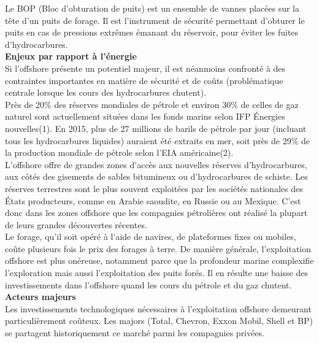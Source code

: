 \documentclass[8pt]{article}
\begin{document}
Le BOP (Bloc d’obturation de puits) est un ensemble de vannes placées sur la tête d’un puits de forage. Il est l’instrument de sécurité permettant d’obturer le puits en cas de pressions extrêmes émanant du réservoir, pour éviter les fuites d’hydrocarbures.\\

\textbf{Enjeux par rapport à l'énergie}\\

Si l’offshore présente un potentiel majeur, il est néanmoins confronté à des contraintes importantes en matière de sécurité et de coûts (problématique centrale lorsque les cours des hydrocarbures chutent).\\

Près de 20\% des réserves mondiales de pétrole et environ 30\% de celles de gaz naturel sont actuellement situées dans les fonds marins selon IFP Énergies nouvelles(1). En 2015, plus de 27 millions de barils de pétrole par jour (incluant tous les hydrocarbures liquides) auraient été extraits en mer, soit près de 29\% de la production mondiale de pétrole selon l'EIA américaine(2).\\

L’offshore offre de grandes zones d'accès aux nouvelles réserves d’hydrocarbures, aux côtés des gisements de sables bitumineux ou d'hydrocarbures de schiste. Les réserves terrestres sont le plus souvent exploitées par les sociétés nationales des États producteurs, comme en Arabie saoudite, en Russie ou au Mexique. C'est donc dans les zones offshore que les compagnies pétrolières ont réalisé la plupart de leurs grandes découvertes récentes.\\

Le forage, qu'il soit opéré à l'aide de navires, de plateformes fixes ou mobiles, coûte plusieurs fois le prix des forages à terre. De manière générale, l’exploitation offshore est plus onéreuse, notamment parce que la profondeur marine complexifie l’exploration mais aussi l’exploitation des puits forés. Il en résulte une baisse des investissements dans l'offshore quand les cours du pétrole et du gaz chutent.\\

\textbf{Acteurs majeurs}\\

Les investissements technologiques nécessaires à l’exploitation offshore demeurant particulièrement coûteux. Les majors (Total, Chevron, Exxon Mobil, Shell et BP) se partagent historiquement ce marché parmi les compagnies privées.\\
\end{document}
